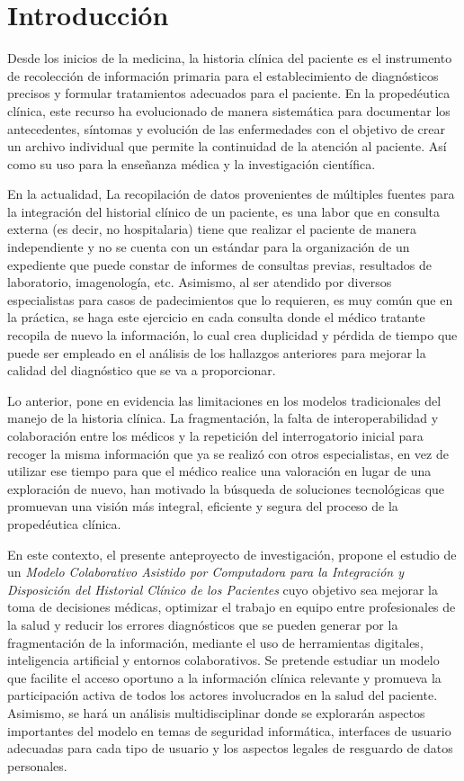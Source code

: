 \setlength{\parskip}{1em} %
\setlength{\parindent}{0pt} %
\section{Introducción}
Desde los inicios de la medicina, la historia clínica del paciente es el instrumento de recolección de información primaria para el establecimiento de diagnósticos precisos y formular tratamientos adecuados para el paciente. En la propedéutica clínica, este recurso ha evolucionado de manera sistemática para documentar los antecedentes, síntomas y evolución de las enfermedades con el objetivo de crear un archivo individual que permite la continuidad de la atención al paciente. Así como su uso para la enseñanza médica y la investigación científica. 

En la actualidad, La recopilación de datos provenientes de múltiples fuentes para la integración del historial clínico de un paciente, es una labor que en consulta externa (es decir, no hospitalaria) tiene que realizar el paciente de manera independiente y no se cuenta con un estándar para la organización de un expediente que puede constar de informes de consultas previas, resultados de laboratorio, imagenología, etc. Asimismo, al ser atendido por diversos especialistas para casos de padecimientos que lo requieren, es muy común que en la práctica, se haga este ejercicio en cada consulta donde el médico tratante recopila de nuevo la información, lo cual crea duplicidad y pérdida de tiempo que puede ser empleado en el análisis de los hallazgos anteriores para mejorar la calidad del diagnóstico que se va a proporcionar. 

Lo anterior, pone en evidencia las limitaciones en los modelos tradicionales del manejo de la historia clínica. La fragmentación, la falta de interoperabilidad y colaboración entre los médicos y la repetición del interrogatorio inicial para recoger la misma información que ya se realizó con otros especialistas, en vez de utilizar ese tiempo para que el médico realice una valoración en lugar de una exploración de nuevo, han motivado la búsqueda de soluciones tecnológicas que promuevan una visión más integral, eficiente y segura del proceso de la propedéutica clínica.

En este contexto, el presente anteproyecto de investigación, propone el estudio de un \textit{Modelo Colaborativo Asistido por Computadora para la Integración y Disposición del Historial Clínico de los Pacientes} cuyo objetivo sea mejorar la toma de decisiones médicas, optimizar el trabajo en equipo entre profesionales de la salud y reducir los errores diagnósticos que se pueden generar por la fragmentación de la información, mediante el uso de herramientas digitales, inteligencia artificial y entornos colaborativos. Se pretende estudiar un modelo que facilite el acceso oportuno a la información clínica relevante y promueva la participación activa de todos los actores involucrados en la salud del paciente. Asimismo, se hará un análisis multidisciplinar donde se explorarán aspectos importantes del modelo en temas de seguridad informática, interfaces de usuario adecuadas para cada tipo de usuario y los aspectos legales de resguardo de datos personales.
